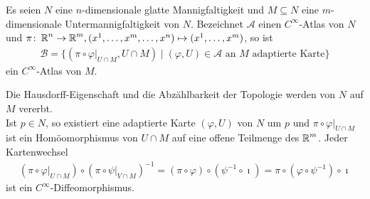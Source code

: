 \begin{Dfn}[Untermannigfaltigkeit]
\begin{center}
\end{center}

\end{Dfn}

\begin{Lemma}
  Es seien $N$ eine $n$-dimensionale glatte Mannigfaltigkeit und $M \subseteq N$ eine $m$-dimensionale Untermannigfaltigkeit von $N$. Bezeichnet $\mathcal A$ einen $C^{\infty}$-Atlas von $N$ und $\pi \colon \operatorname{\mathbb{R}}^n \to \operatorname{\mathbb{R}}^m, (x^1, \ldots, x^m,\ldots,x^n) \mapsto (x^1, \ldots, x^m)$, so ist
  \begin{align*}
    \mathcal B = \{(\pi \circ \varphi|_{U \cap M},U\cap M) \mid (\varphi, U) \in \mathcal A \text{ an } M \text{ adaptierte Karte}\}
  \end{align*}
  ein $C^{\infty}$-Atlas von $M$.
\end{Lemma}

\begin{bew}
  Die Hausdorff-Eigenschaft und die Abzählbarkeit der Topologie werden von $N$ auf $M$ vererbt.\\
  Ist $p \in N$, so existiert eine adaptierte Karte $(\varphi,U)$ von $N$ um $p$ und $\pi \circ \varphi|_{U \cap M}$ ist ein Homöomorphismus von $U \cap M$ auf eine offene Teilmenge des $\operatorname{\mathbb{R}}^m$. Jeder Kartenwechsel
  \begin{align*}
    (\pi \circ \varphi|_{U \cap M}) \circ (\pi \circ \psi|_{V \cap M})^{-1} = (\pi \circ \varphi) \circ (\psi^{-1} \circ \imath) = \pi \circ (\varphi \circ \psi^{-1}) \circ \imath
  \end{align*}
  ist ein $C^{\infty}$-Diffeomorphismus.
\end{bew}

